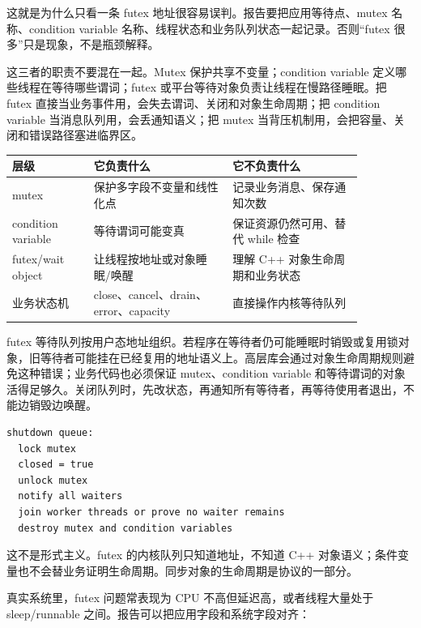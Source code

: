 这就是为什么只看一条 futex 地址很容易误判。报告要把应用等待点、mutex 名称、condition variable 名称、线程状态和业务队列状态一起记录。否则“futex 很多”只是现象，不是瓶颈解释。

这三者的职责不要混在一起。Mutex 保护共享不变量；condition variable 定义哪些线程在等待哪些谓词；futex 或平台等待对象负责让线程在慢路径睡眠。把 futex 直接当业务事件用，会失去谓词、关闭和对象生命周期；把 condition variable 当消息队列用，会丢通知语义；把 mutex 当背压机制用，会把容量、关闭和错误路径塞进临界区。

\begin{center}
\small
\begin{tabular}{p{0.20\linewidth}p{0.34\linewidth}p{0.32\linewidth}}
\toprule
层级 & 它负责什么 & 它不负责什么 \\
\midrule
mutex & 保护多字段不变量和线性化点 & 记录业务消息、保存通知次数 \\
condition variable & 等待谓词可能变真 & 保证资源仍然可用、替代 while 检查 \\
futex/wait object & 让线程按地址或对象睡眠/唤醒 & 理解 C++ 对象生命周期和业务状态 \\
业务状态机 & close、cancel、drain、error、capacity & 直接操作内核等待队列 \\
\bottomrule
\end{tabular}
\end{center}

futex 等待队列按用户态地址组织。若程序在等待者仍可能睡眠时销毁或复用锁对象，旧等待者可能挂在已经复用的地址语义上。高层库会通过对象生命周期规则避免这种错误；业务代码也必须保证 mutex、condition variable 和等待谓词的对象活得足够久。关闭队列时，先改状态，再通知所有等待者，再等待使用者退出，不能边销毁边唤醒。

\begin{lstlisting}[numbers=none,caption={销毁同步对象前必须清空等待协议}]
shutdown queue:
  lock mutex
  closed = true
  unlock mutex
  notify all waiters
  join worker threads or prove no waiter remains
  destroy mutex and condition variables
\end{lstlisting}

这不是形式主义。futex 的内核队列只知道地址，不知道 C++ 对象语义；条件变量也不会替业务证明生命周期。同步对象的生命周期是协议的一部分。

真实系统里，futex 问题常表现为 CPU 不高但延迟高，或者线程大量处于 sleep/runnable 之间。报告可以把应用字段和系统字段对齐：

